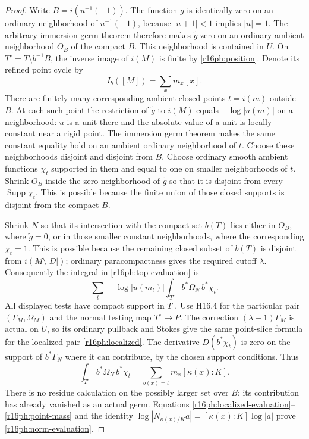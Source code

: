 \documentclass[11pt,a4paper]{article}
\theoremstyle{definition}
\theoremstyle{remark}
\numberwithin{equation}{section}
\begin{document}
\begin{proof}
Write $B=i(u^{-1}(-1))$.  The function $g$ is identically zero
on an ordinary neighborhood of $u^{-1}(-1)$, because
$|u+1|<1$ implies $|u|=1$.  The arbitrary immersion germ theorem
therefore makes $\widetilde g$ zero on an ordinary ambient
neighborhood $O_B$ of the compact $B$.  This neighborhood is
contained in $U$.  On
$T^\circ=T\setminus b^{-1}B$, the inverse image of $i(M)$
is finite by \eqref{r16ph:position}.  Denote its refined point
cycle by
\[
                         I_b([M])=\sum_x m_x[x].
 \tag{PH16.6}\label{r16ph:points}
\]
There are finitely many corresponding ambient closed points
$t=i(m)$ outside $B$.  At each such point the restriction of
$\widetilde g$ to $i(M)$ equals $-\log|u(m)|$ on a neighborhood:
$u$ is a unit there and the absolute value of a unit is locally
constant near a rigid point.  The immersion germ theorem makes
the same constant equality hold on an ambient ordinary neighborhood
of $t$.  Choose these neighborhoods disjoint and disjoint from $B$.
Choose ordinary smooth ambient functions $\chi_t$ supported in
them and equal to one on smaller neighborhoods of $t$.
Shrink $O_B$ inside the zero neighborhood of $\widetilde g$ so
that it is disjoint from every $\operatorname{Supp}\chi_t$.
This is possible because the finite union of those closed
supports is disjoint from the compact $B$.

Shrink $N$ so that its intersection with the compact set $b(T)$
lies either in $O_B$, where $\widetilde g=0$, or in those smaller
constant neighborhoods, where the corresponding $\chi_t=1$.
This is possible because the remaining closed subset of $b(T)$
is disjoint from $i(M\setminus|D|)$; ordinary paracompactness
gives the required cutoff $\lambda$.  Consequently the integral
in \eqref{r16ph:top-evaluation} is
\[
       \sum_t -\log|u(m_t)|
                       \int_{T^\circ}b^*\Omega_N\,b^*\chi_t.
 \tag{PH16.7}\label{r16ph:localized-evaluation}
\]
All displayed tests have compact support in $T^\circ$.
Use H16.4 for the particular pair $(\Gamma_M,\Omega_M)$
and the normal testing map $T^\circ\to P$.  The correction
$(\lambda-1)\Gamma_M$ is actual on $U$, so its ordinary pullback
and Stokes give the same point-slice formula for the localized
pair \eqref{r16ph:localized}.
The derivative $D(b^*\chi_t)$ is zero on the support of
$b^*\Gamma_N$ where it can contribute, by the chosen support
conditions.  Thus
\[
           \int_{T^\circ}b^*\Omega_N\,b^*\chi_t
                     =\sum_{b(x)=t}m_x[\kappa(x):K].
 \tag{PH16.8}\label{r16ph:point-mass}
\]
There is no residue calculation on the possibly larger set over
$B$; its contribution has already vanished as an actual germ.
Equations \eqref{r16ph:localized-evaluation}--\eqref{r16ph:point-mass}
and the identity
$\log|N_{\kappa(x)/K}a|=[\kappa(x):K]\log|a|$
prove \eqref{r16ph:norm-evaluation}.


\end{proof}
\end{document}

